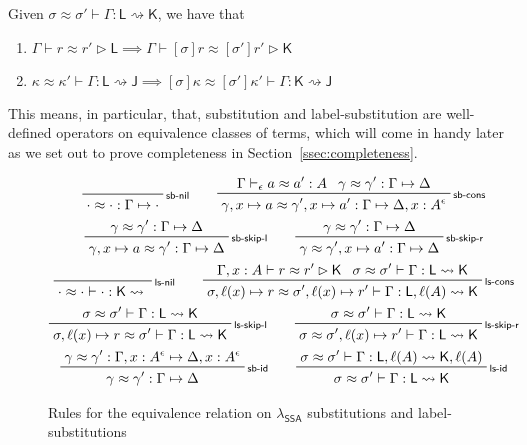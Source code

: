 \documentclass[acmsmall,screen,review]{acmart}
\newcommand{\ms}[1]{\ensuremath{\mathsf{#1}}}
\newcommand{\thyp}[3]{#1 : {#2}^{#3}}
\newcommand{\bhyp}[2]{#1 : #2}
\newcommand{\lhyp}[2]{#1(#2)}
\newcommand{\rle}[1]{{\scriptsize\textsf{#1}}}
\newcommand{\issubst}[3]{#1: #2 \mapsto #3}
\newcommand{\lbsubst}[4]{#1 \vdash #2: #3 \rightsquigarrow #4}
\newcommand{\teqv}{\approx}
\newcommand{\tmeq}[5]{#1 \vdash_{#2} #3 \teqv #4 : {#5}}
\newcommand{\lbeq}[4]{#1 \vdash #2 \teqv #3 \rhd {#4}}
\newcommand{\tmseq}[4]{\issubst{#1 \teqv #2}{#3}{#4}}
\newcommand{\lbseq}[5]{\lbsubst{#1 \teqv #2}{#3}{#4}{#5}}
\newcommand{\isotopessa}{\(\lambda_{\ms{SSA}}\)}
\begin{document}
\begin{lemma}
  Given $\lbseq{\sigma}{\sigma'}{\Gamma}{\ms{L}}{\ms{K}}$, we have that
  \begin{enumerate}[label=(\alph*)]
    \item $\lbeq{\Gamma}{r}{r'}{\ms{L}} \implies \lbeq{\Gamma}{[\sigma]r}{[\sigma']r'}{\ms{K}}$
    \item $\lbseq{\kappa}{\kappa'}{\Gamma}{\ms{L}}{\ms{J}}
      \implies \lbseq{[\sigma]\kappa}{[\sigma']\kappa'}{\Gamma}{\ms{K}}{\ms{J}}$
  \end{enumerate}
\end{lemma}
This means, in particular, that, substitution and label-substitution are well-defined operators on
equivalence classes of terms, which will come in handy later as we set out to prove completeness
in Section~\ref{ssec:completeness}.

\begin{figure}
  \begin{gather*}
    \prftree[r]{\rle{sb-nil}}{\tmseq{\cdot}{\cdot}{\Gamma}{\cdot}} \qquad
    \prftree[r]{\rle{sb-cons}}
      {\tmeq{\Gamma}{\epsilon}{a}{a'}{A}}{\tmseq{\gamma}{\gamma'}{\Gamma}{\Delta}}
      {\tmseq{\gamma, x \mapsto a}{\gamma', x \mapsto a'}{\Gamma}{\Delta, \thyp{x}{A}{\epsilon}}}
    \\
    \prftree[r]{\rle{sb-skip-l}}
      {\tmseq{\gamma}{\gamma'}{\Gamma}{\Delta}}
      {\tmseq{\gamma, x \mapsto a}{\gamma'}{\Gamma}{\Delta}} \qquad
    \prftree[r]{\rle{sb-skip-r}}
      {\tmseq{\gamma}{\gamma'}{\Gamma}{\Delta}}
      {\tmseq{\gamma}{\gamma', x \mapsto a'}{\Gamma}{\Delta}}
    \\
    \prftree[r]{\rle{ls-nil}}{\lbseq{\cdot}{\cdot}{\cdot}{\ms{K}}} \qquad
    \prftree[r]{\rle{ls-cons}}
      {\lbeq{\Gamma, \bhyp{x}{A}}{r}{r'}{\ms{K}}}
      {\lbseq{\sigma}{\sigma'}{\Gamma}{\ms{L}}{\ms{K}}}
      {\lbseq
        {\sigma, \ell(x) \mapsto r}{\sigma', \ell(x) \mapsto r'}{\Gamma}
        {\ms{L}, \ell(A)}{\ms{K}}}
    \\
    \prftree[r]{\rle{ls-skip-l}}
      {\lbseq{\sigma}{\sigma'}{\Gamma}{\ms{L}}{\ms{K}}}
      {\lbseq{\sigma, \ell(x) \mapsto r}{\sigma'}{\Gamma}{\ms{L}}{\ms{K}}}
      \qquad
    \prftree[r]{\rle{ls-skip-r}}
      {\lbseq{\sigma}{\sigma'}{\Gamma}{\ms{L}}{\ms{K}}}
      {\lbseq{\sigma}{\sigma', \ell(x) \mapsto r'}{\Gamma}{\ms{L}}{\ms{K}}}
    \\
    \prftree[r]{\rle{sb-id}}
      {\tmseq{\gamma}{\gamma'}{\Gamma, \thyp{x}{A}{\epsilon}}{\Delta, \thyp{x}{A}{\epsilon}}}
      {\tmseq{\gamma}{\gamma'}{\Gamma}{\Delta}} \qquad
    \prftree[r]{\rle{ls-id}}
      {\lbseq{\sigma}{\sigma'}{\Gamma}{\ms{L}, \lhyp{\ell}{A}}{\ms{K}, \lhyp{\ell}{A}}}
      {\lbseq{\sigma}{\sigma'}{\Gamma}{\ms{L}}{\ms{K}}}
  \end{gather*}
  \Description{}
  \caption{Rules for the equivalence relation on \isotopessa{} substitutions and label-substitutions}
  \label{fig:ssa-subst-equiv}
\end{figure}
\end{document}
